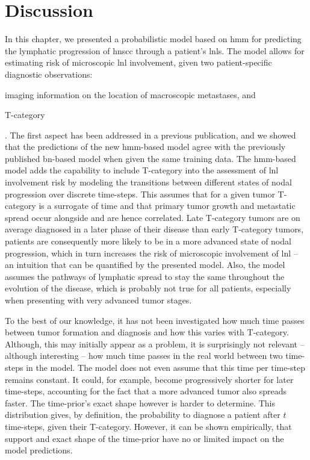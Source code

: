 \documentclass[\relativeRoot/main.tex]{subfiles}
\begin{document}
\section{Discussion}
\label{sec:unilateral:discussion}

In this chapter, we presented a probabilistic model based on \gls{hmm} for predicting the lymphatic progression of \gls{hnscc} through a patient's \glspl{lnl}. The model allows for estimating risk of microscopic \gls{lnl} involvement, given two patient-specific diagnostic observations:
\begin{enumerate*}[label={(\arabic*)}]
    \item imaging information on the location of macroscopic metastases, and
    \item T-category
\end{enumerate*}. The first aspect has been addressed in a previous publication, and we showed that the predictions of the new \gls{hmm}-based model agree with the previously published \gls{bn}-based model when given the same training data. The \gls{hmm}-based model adds the capability to include T-category into the assessment of \gls{lnl} involvement risk by modeling the transitions between different states of nodal progression over discrete time-steps. This assumes that for a given tumor T-category is a surrogate of time and that primary tumor growth and metastatic spread occur alongside and are hence correlated. Late T-category tumors are on average diagnosed in a later phase of their disease than early T-category tumors, patients are consequently more likely to be in a more advanced state of nodal progression, which in turn increases the risk of microscopic involvement of \gls{lnl} -- an intuition that can be quantified by the presented model. Also, the model assumes the pathways of lymphatic spread to stay the same throughout the evolution of the disease, which is probably not true for all patients, especially when presenting with very advanced tumor stages.

To the best of our knowledge, it has not been investigated how much time passes between tumor formation and diagnosis and how this varies with T-category. Although, this may initially appear as a problem, it is surprisingly not relevant -- although interesting -- how much time passes in the real world between two time-steps in the model. The model does not even assume that this time per time-step remains constant. It could, for example, become progressively shorter for later time-steps, accounting for the fact that a more advanced tumor also spreads faster. The time-prior's exact shape however is harder to determine. This distribution gives, by definition, the probability to diagnose a patient after $t$ time-steps, given their T-category. However, it can be shown empirically, that support and exact shape of the time-prior have no or limited impact on the model predictions.
\end{document}
